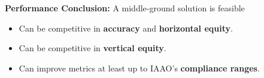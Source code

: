 \documentclass[aspectratio=169,10pt]{beamer}
\begin{document}
\begin{frame}{\frameF}
\begin{block}{ \textbf{Performance Conclusion:} A middle-ground solution is feasible}
   \begin{itemize}
  \item Can be competitive in \textbf{accuracy} and \textbf{horizontal equity}. 
  \item Can be competitive in \textbf{vertical equity}. 
  \item Can improve metrics at least up to IAAO's \textbf{compliance ranges}. \\
   \end{itemize}

\end{block}
    
\end{frame}


\end{document}
